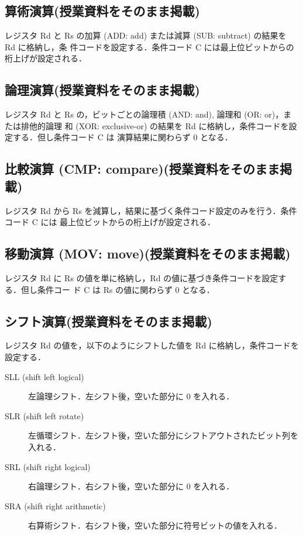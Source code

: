 \documentclass[a4j,titlepage]{jarticle}
\begin{document}
\subsection{算術演算(授業資料をそのまま掲載)}
レジスタ Rd と Rs の加算 (ADD: add) または減算 (SUB: subtract) の結果を Rd に格納し，条
件コードを設定する．条件コード C には最上位ビットからの桁上げが設定される．

\subsection{論理演算(授業資料をそのまま掲載)}
レジスタ Rd と Rs の，ビットごとの論理積 (AND: and), 論理和 (OR: or)，または排他的論理
和 (XOR: exclusive-or) の結果を Rd に格納し，条件コードを設定する．但し条件コード C は
演算結果に関わらず 0 となる．

\subsection{比較演算 (CMP: compare)(授業資料をそのまま掲載)}
レジスタ Rd から Rs を減算し，結果に基づく条件コード設定のみを行う．条件コード C には
最上位ビットからの桁上げが設定される．

\subsection{移動演算 (MOV: move)(授業資料をそのまま掲載)}
レジスタ Rd に Rs の値を単に格納し，Rd の値に基づき条件コードを設定する．但し条件コー
ド C は Rs の値に関わらず 0 となる．

\subsection{シフト演算(授業資料をそのまま掲載)}
レジスタ Rd の値を，以下のようにシフトした値を Rd に格納し，条件コードを設定する．

\begin{description}
\item [SLL (shift left logical)] 左論理シフト．左シフト後，空いた部分に 0 を入れる．
\item [SLR (shift left rotate)] 左循環シフト．左シフト後，空いた部分にシフトアウトされたビット列を入れる．
\item [SRL (shift right logical)] 右論理シフト．右シフト後，空いた部分に 0 を入れる．
\item [SRA (shift right arithmetic)] 右算術シフト．右シフト後，空いた部分に符号ビットの値を入れる．
\end{description}
\end{document}
